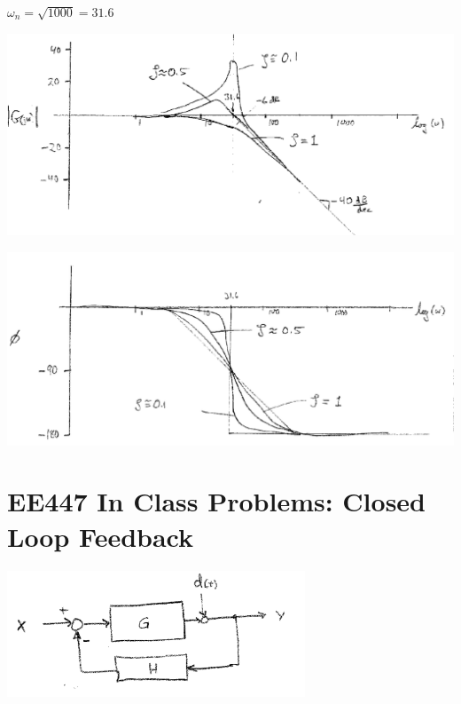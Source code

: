 \documentclass{article}	%
\begin{document}
\begin{solution}
$\omega_n = \sqrt{1000} = 31.6$

\includegraphics[width=6.0in]{00954a.png}

\includegraphics[width=6.0in]{00955a.png}


\end{solution}




\newpage
\section{EE447 In Class Problems: Closed Loop Feedback}

\includegraphics[width=3.5in]{00388a.png}
\end{document}
